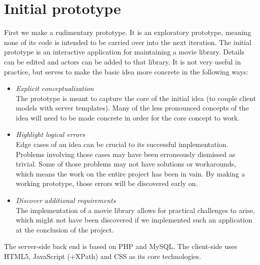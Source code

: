 \chapter{Initial prototype}
First we make a rudimentary prototype. It is an exploratory prototype,
meaning none of its code is intended to be carried over into the next iteration.
The initial prototype is an interactive application for maintaining a movie
library. Details can be edited and actors can be added to that library.
It is not very useful in practice, but serves to make the basic idea more
concrete in the following ways:

\begin{itemize}
	\label{list:prototype-motivation}
	\item \emph{Explicit conceptualization}\\
	The prototype is meant to capture the core of the initial idea (to couple
	client models with server templates).
	Many of the less pronounced concepts of the idea will need to be made concrete
	in order for the core concept to work.
	\item \emph{Highlight logical errors}\\
	Edge cases of an idea can be crucial to its successful implementation.
	Problems involving those cases may have been erroneously dismissed as trivial.
	Some of those problems may not have solutions or workarounds, which
	means the work on the entire project has been in vain. By making a working
	prototype, those errors will be discovered early on.
	\item \emph{Discover additional requirements}\\
	The implementation of a movie library allows for practical challenges to
	arise, which might not have been discovered if we implemented such an
	application at the conclusion of the project.
\end{itemize}

The server-side back end is based on PHP and MySQL. The client-side uses
HTML5, JavaScript (+XPath) and CSS as its core technologies.

